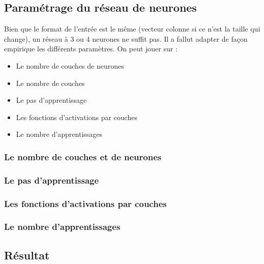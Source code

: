 \subsection{Paramétrage du réseau de neurones}
Bien que le format de l'entrée est le même (vecteur colonne si ce n'est la taille qui change), un réseau à 3 ou 4 neurones ne suffit pas. Il a fallut adapter de façon empirique les différents paramètres. On peut jouer sur :
\begin{itemize}
  \item Le nombre de couches de neurones
  \item Le nombre de couches
  \item Le pas d'apprentissage
  \item Les fonctions d'activations par couches
  \item Le nombre d'apprentissages
\end{itemize}
\subsubsection{Le nombre de couches et de neurones}

\subsubsection{Le pas d'apprentissage}

\subsubsection{Les fonctions d'activations par couches}

\subsubsection{Le nombre d'apprentissages}

\subsection{Résultat}

